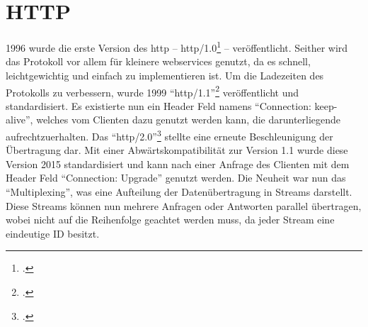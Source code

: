 \section{HTTP}\label{sec:http}
	1996 wurde die erste Version des \gls{http}
	-- \gls{http}/1.0\footcite[Vgl.][]{rfc1945} --
	veröffentlicht.
	Seither wird das Protokoll vor allem für kleinere \glspl{webservice} genutzt,
	da es schnell, leichtgewichtig und einfach zu implementieren ist.
	Um die Ladezeiten des Protokolls zu verbessern,
	wurde 1999 \enquote{\gls{http}/1.1}\footcite[Vgl.][]{rfc7230} veröffentlicht und standardisiert.
	Es existierte nun ein Header Feld namens \enquote{Connection: keep-alive},
	welches vom Clienten dazu genutzt werden kann,
	die darunterliegende  aufrechtzuerhalten.
	Das \enquote{\gls{http}/2.0}\footcite[Vgl.][]{rfc7540} stellte eine erneute Beschleunigung der Übertragung dar.
	Mit einer Abwärtskompatibilität zur Version 1.1 wurde diese Version 2015 standardisiert
	und kann nach einer Anfrage des Clienten mit dem Header Feld \enquote{Connection: Upgrade} genutzt werden.
	Die Neuheit war nun das \enquote{Multiplexing},
	was eine Aufteilung der Datenübertragung in Streams darstellt.
	Diese Streams können nun mehrere Anfragen oder Antworten parallel übertragen,
	wobei nicht auf die Reihenfolge geachtet werden muss,
	da jeder Stream eine eindeutige ID besitzt.

